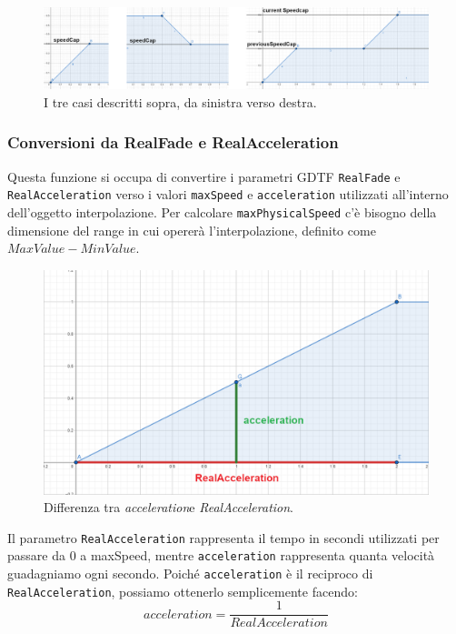 \documentclass[main.tex]{subfiles}
\begin{document}
\begin{figure}[H]
    \centering
    \includegraphics[width=1\linewidth]{img/interpolazione/speedCapThreeCases-split.png}
    \caption{I tre casi descritti sopra, da sinistra verso destra.}
    \label{fig:4_speedCapThreeCases}
\end{figure}

\subsubsection{Conversioni da RealFade e RealAcceleration}\label{subsubsec:4_2_Conversions}
Questa funzione si occupa di convertire i parametri GDTF \lstinline{RealFade} e \lstinline{RealAcceleration} verso i valori \lstinline{maxSpeed} e \lstinline{acceleration} utilizzati all'interno dell'oggetto interpolazione. Per calcolare \lstinline{maxPhysicalSpeed} c'è bisogno della dimensione del range in cui opererà l'interpolazione, definito come $MaxValue - MinValue$.\newline

\begin{figure}
    \centering
    \captionsetup{justification=centering}
    \includegraphics[scale=0.3]{img/interpolazione/RealAccelerationVSacceleration.png}
    \caption{Differenza tra \textit{acceleration}\newline e \textit{RealAcceleration}.}
    \label{fig:4_RealAccelerationVSacceleration}
\end{figure}
\noindent Il parametro \lstinline{RealAcceleration} rappresenta il tempo in secondi utilizzati per passare da 0 a maxSpeed, mentre \lstinline{acceleration} rappresenta quanta velocità guadagniamo ogni secondo. Poiché \lstinline{acceleration} è il reciproco di \lstinline{RealAcceleration}, possiamo ottenerlo semplicemente facendo:
\[acceleration = \frac{1}{RealAcceleration}\] %
\clearpage %
\end{document}
